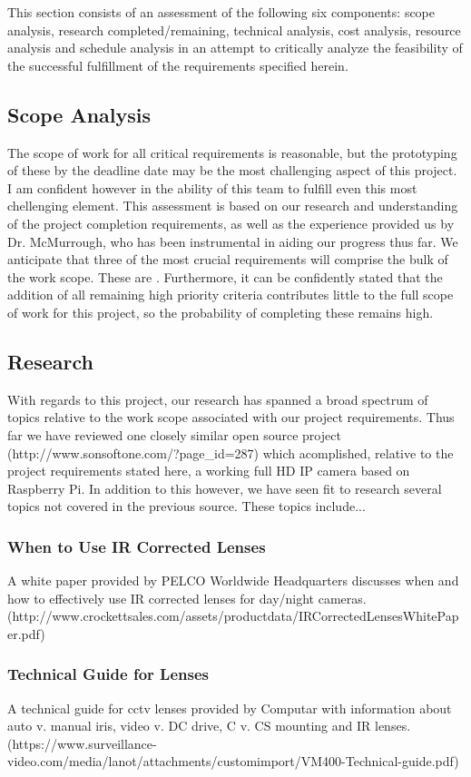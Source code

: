 This section consists of an assessment of the following six components: scope analysis, research completed/remaining, technical analysis, cost analysis, resource analysis and schedule analysis in an attempt to critically analyze the feasibility of the successful fulfillment of the requirements specified herein.
\subsection{Scope Analysis}
The scope of work for all critical requirements is reasonable, but the prototyping of these by the deadline date may be the most challenging aspect of this project. I am confident however in the ability of this team to fulfill even this most chellenging element. This assessment is based on our research and understanding of the project completion requirements, as well as the experience provided us by Dr. McMurrough, who has been instrumental in aiding our progress thus far. We anticipate that three of the most crucial requirements will comprise the bulk of the work scope. These are{ }. Furthermore, it can be confidently stated that the addition of all remaining high priority criteria contributes little to the full scope of work for this project, so the probability of completing these remains high.
\subsection{Research}
With regards to this project, our research has spanned a broad spectrum of topics relative to the work scope associated with our project requirements. Thus far we have reviewed one closely similar open source project (http://www.sonsoftone.com/?page_id=287) which acomplished, relative to the project requirements stated here, a working full HD IP camera based on Raspberry Pi. In addition to this however, we have seen fit to research several topics not covered in the previous source. These topics include...
\subsubsection{When to Use IR Corrected Lenses}
A white paper provided by PELCO Worldwide Headquarters discusses when and how to effectively use IR corrected lenses for day/night cameras. (http://www.crockettsales.com/assets/productdata/IRCorrectedLensesWhitePaper.pdf)
\subsubsection{Technical Guide for Lenses}
A technical guide for cctv lenses provided by Computar with information about auto v. manual iris, video v. DC drive, C v. CS mounting and IR lenses. (https://www.surveillance-video.com/media/lanot/attachments/customimport/VM400-Technical-guide.pdf)
